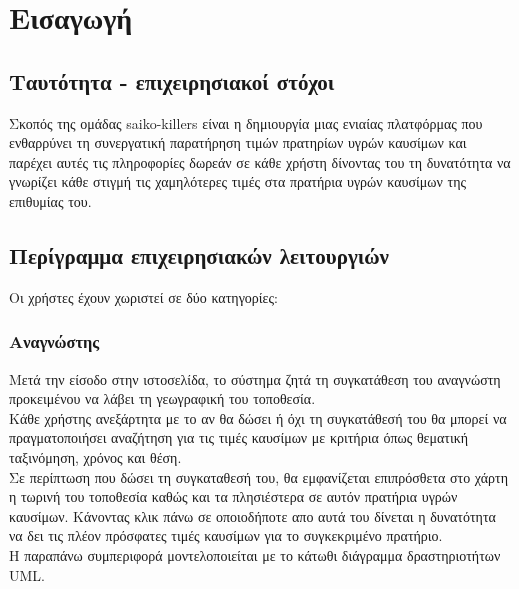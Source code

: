 \section{Εισαγωγή}

\subsection{Ταυτότητα - επιχειρησιακοί στόχοι}

Σκοπός της ομάδας saiko-killers είναι η δημιουργία μιας ενιαίας πλατφόρμας που ενθαρρύνει τη συνεργατική παρατήρηση τιμών πρατηρίων υγρών καυσίμων και παρέχει αυτές τις πληροφορίες δωρεάν σε κάθε χρήστη δίνοντας του τη δυνατότητα να γνωρίζει κάθε στιγμή τις χαμηλότερες τιμές στα πρατήρια υγρών καυσίμων της επιθυμίας του.

\subsection{Περίγραμμα επιχειρησιακών λειτουργιών}

Οι χρήστες έχουν χωριστεί σε δύο κατηγορίες:

\subsubsection*{Αναγνώστης}
Μετά την είσοδο στην ιστοσελίδα, το σύστημα ζητά τη συγκατάθεση του αναγνώστη προκειμένου να λάβει τη γεωγραφική του τοποθεσία. \\
Κάθε χρήστης ανεξάρτητα με το αν θα δώσει ή όχι τη συγκατάθεσή του θα μπορεί να πραγματοποιήσει αναζήτηση για τις τιμές καυσίμων με κριτήρια όπως θεματική ταξινόμηση, χρόνος και θέση.\\
Σε περίπτωση που δώσει τη συγκαταθεσή του, θα εμφανίζεται επιπρόσθετα στο χάρτη η τωρινή του τοποθεσία καθώς και τα πλησιέστερα σε αυτόν πρατήρια υγρών καυσίμων. Κάνοντας κλικ πάνω σε οποιοδήποτε απο αυτά του δίνεται η δυνατότητα να δει τις πλέον πρόσφατες τιμές καυσίμων για το συγκεκριμένο πρατήριο.\\
Η παραπάνω συμπεριφορά μοντελοποιείται με το κάτωθι διάγραμμα δραστηριοτήτων UML.

